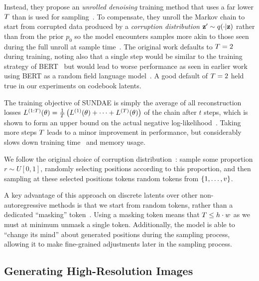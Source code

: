 Instead, they propose an \textit{unrolled denoising} training method that uses a
far lower $T$ than is used for
sampling~\cite{savinov2022stepunrolled}. To compensate, they unroll the Markov
chain to start from corrupted data produced by a \textit{corruption
distribution} $\mathbf{z}' \sim q(\cdot \vert \mathbf{z})$ rather than from the prior $p_0$ so the model
encounters samples more akin to those seen during the full unroll at sample
time~\cite{savinov2022stepunrolled}. The original work defaults to $T
= 2$ during training, noting also that a single step would be similar to the
training strategy of BERT~\cite{devlin2019bert} but would lead to worse
performance as seen in earlier work using BERT as a random field language
model~\cite{wang2019bert}. A good default of $T = 2$ held true in our
experiments on codebook latents.

The training objective of SUNDAE is simply the average of all reconstruction
losses $L^{(1:T)}(\theta) = \frac{1}{T} \left(L^{(1)}(\theta) + \dots +
L^{(T)}(\theta) \right)$ of the chain after $t$ steps, which is shown to form
an upper bound on the actual negative
log-likelihood~\cite{savinov2022stepunrolled}. Taking more steps $T$
leads to a minor improvement in performance, but considerably slows down
training time~\cite{savinov2022stepunrolled} and memory usage.

We follow the original choice of corruption
distribution~\cite{savinov2022stepunrolled}: sample some
proportion $r \sim U[0, 1]$, randomly selecting positions according to this
proportion, and then sampling at these selected positions tokens random tokens
from $\{1, \dots, v\}$.

A key advantage of this approach on discrete latents over other
non-autoregressive methods is that we start from random tokens, rather than a
dedicated ``masking'' token~\cite{bondtaylor2021unleashing}. Using a masking
token means that $T \leq h\cdot w$ as we must at minimum unmask a single
token. Additionally, the model is able to ``change its mind'' about generated
positions during the sampling process, allowing it to make fine-grained
adjustments later in the sampling process.


\subsection{Generating High-Resolution Images}

